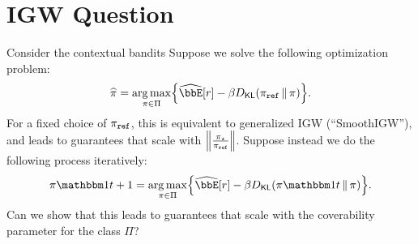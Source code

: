 \documentclass{article}
\begin{document}
\section{IGW Question}
Consider the contextual bandits
Suppose we solve the following optimization problem:
\[
  \pihat=\argmax_{\pi\in\Pi}\crl*{
    \Eh\brk*{r} - \beta\Dkl{\piref}{\pi}}.
\]
For a fixed choice of $\piref$, this is equivalent to generalized IGW
(``SmoothIGW''), and leads to guarantees that scale with
$\nrm*{\frac{\pistar}{\piref}}$. Suppose instead we do the following
process iteratively:
\[
  \pi\ind{t+1}=\argmax_{\pi\in\Pi}\crl*{
    \Eh\brk*{r} - \beta\Dkl{\pi\ind{t}}{\pi}}.
\]
Can we show that this leads to guarantees that scale with the
coverability parameter for the class $\Pi$?

\begin{comment}
\section{To-do list}
To-do list:
\begin{itemize}
\item Exponential weights-type analysis:
  \begin{itemize}
  \item Re-do exp-weights analysis on the objective, but:
    \begin{itemize}
    \item Do the contextual case and handle noise coming from
      contexts. Try to do hellinger stuff and get the fast rate? 
    \item Handle the case where we solve the Exp Weights objective
      using ERM (do the case above first).
    \end{itemize}
    \item Applying the result to entropy:
      \begin{itemize}
      \item Try to get a fast rate for minimizing entropy from
        this guarantee.
      \item Try to directly get a descent lemma for minimizing entropy
        (don't need to go through the full OL analysis).
        \begin{itemize}
        \item This gives parameter convergence, which may be useful
          for other things we want to do.
        \end{itemize}
    \end{itemize}
  \end{itemize}
\item Showing convergence to argmax:
  \begin{itemize}
  \item Focus on the case where $\Pi$ is parameterized via softmax
    policies to start.
  \item Is there a way to directly derive this from the exp
    

\end{comment}
\end{document}
